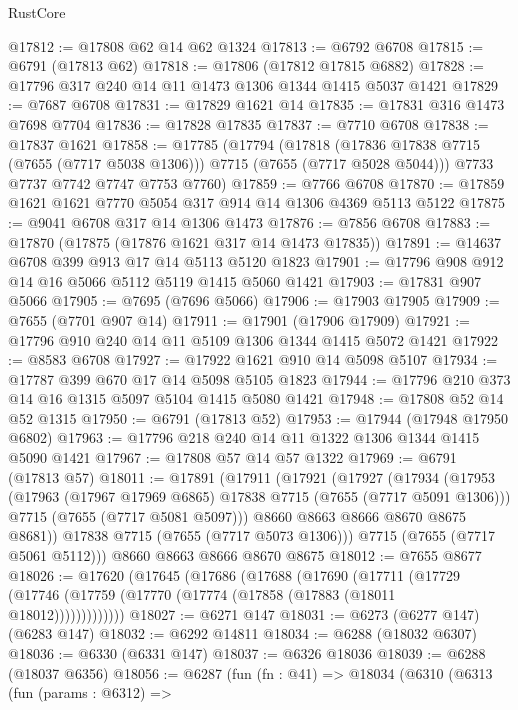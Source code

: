 \begin{lexlean}{RustCore}
\begin{coremodule}
@17812 := @17808 @62 @14 @62 @1324
@17813 := @6792 @6708
@17815 := @6791 (@17813 @62)
@17818 := @17806 (@17812 @17815 @6882)
@17828 := @17796 @317 @240 @14 @11 @1473 @1306 @1344 @1415 @5037 @1421
@17829 := @7687 @6708
@17831 := @17829 @1621 @14
@17835 := @17831 @316 @1473 @7698 @7704
@17836 := @17828 @17835
@17837 := @7710 @6708
@17838 := @17837 @1621
@17858 := @17785
    (@17794
      (@17818 (@17836 @17838 @7715 (@7655 (@7717 @5038 @1306))) @7715 (@7655 (@7717 @5028 @5044)))
      @7733
      @7737
      @7742
      @7747
      @7753
      @7760)
@17859 := @7766 @6708
@17870 := @17859 @1621 @1621 @7770 @5054 @317 @914 @14 @1306 @4369 @5113 @5122
@17875 := @9041 @6708 @317 @14 @1306 @1473
@17876 := @7856 @6708
@17883 := @17870 (@17875 (@17876 @1621 @317 @14 @1473 @17835))
@17891 := @14637 @6708 @399 @913 @17 @14 @5113 @5120 @1823
@17901 := @17796 @908 @912 @14 @16 @5066 @5112 @5119 @1415 @5060 @1421
@17903 := @17831 @907 @5066
@17905 := @7695 (@7696 @5066)
@17906 := @17903 @17905
@17909 := @7655 (@7701 @907 @14)
@17911 := @17901 (@17906 @17909)
@17921 := @17796 @910 @240 @14 @11 @5109 @1306 @1344 @1415 @5072 @1421
@17922 := @8583 @6708
@17927 := @17922 @1621 @910 @14 @5098 @5107
@17934 := @17787 @399 @670 @17 @14 @5098 @5105 @1823
@17944 := @17796 @210 @373 @14 @16 @1315 @5097 @5104 @1415 @5080 @1421
@17948 := @17808 @52 @14 @52 @1315
@17950 := @6791 (@17813 @52)
@17953 := @17944 (@17948 @17950 @6802)
@17963 := @17796 @218 @240 @14 @11 @1322 @1306 @1344 @1415 @5090 @1421
@17967 := @17808 @57 @14 @57 @1322
@17969 := @6791 (@17813 @57)
@18011 := @17891
    (@17911
      (@17921
        (@17927
          (@17934
            (@17953
              (@17963 (@17967 @17969 @6865) @17838 @7715 (@7655 (@7717 @5091 @1306)))
              @7715
              (@7655 (@7717 @5081 @5097)))
            @8660
            @8663
            @8666
            @8670
            @8675
            @8681))
        @17838
        @7715
        (@7655 (@7717 @5073 @1306)))
      @7715
      (@7655 (@7717 @5061 @5112)))
    @8660
    @8663
    @8666
    @8670
    @8675
@18012 := @7655 @8677
@18026 := @17620
    (@17645
      (@17686
        (@17688
          (@17690
            (@17711
              (@17729 (@17746 (@17759 (@17770 (@17774 (@17858 (@17883 (@18011 @18012)))))))))))))
@18027 := @6271 @147
@18031 := @6273 (@6277 @147) (@6283 @147)
@18032 := @6292 @14811
@18034 := @6288 (@18032 @6307)
@18036 := @6330 (@6331 @147)
@18037 := @6326 @18036
@18039 := @6288 (@18037 @6356)
@18056 := @6287
    (fun (fn : @41) =>
    @18034
      (@6310
        (@6313
          (fun (params : @6312) =>

\end{coremodule}
\end{lexlean}
